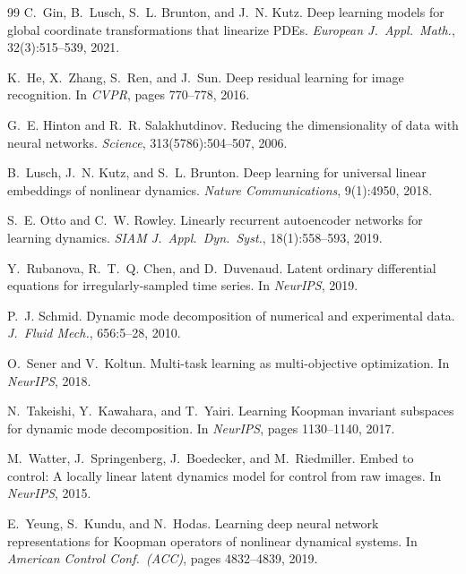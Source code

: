 \documentclass{article}
\begin{document}
\begin{thebibliography}{99}
C.~Gin, B.~Lusch, S.~L. Brunton, and J.~N. Kutz.
\newblock Deep learning models for global coordinate transformations that
  linearize {PDE}s.
\newblock \emph{European J.\ Appl.\ Math.}, 32(3):515--539, 2021.

K.~He, X.~Zhang, S.~Ren, and J.~Sun.
\newblock Deep residual learning for image recognition.
\newblock In \emph{CVPR}, pages 770--778, 2016.

G.~E. Hinton and R.~R. Salakhutdinov.
\newblock Reducing the dimensionality of data with neural networks.
\newblock \emph{Science}, 313(5786):504--507, 2006.

B.~Lusch, J.~N. Kutz, and S.~L. Brunton.
\newblock Deep learning for universal linear embeddings of nonlinear dynamics.
\newblock \emph{Nature Communications}, 9(1):4950, 2018.

S.~E. Otto and C.~W. Rowley.
\newblock Linearly recurrent autoencoder networks for learning dynamics.
\newblock \emph{SIAM J.\ Appl.\ Dyn.\ Syst.}, 18(1):558--593, 2019.

Y.~Rubanova, R.~T.~Q. Chen, and D.~Duvenaud.
\newblock Latent ordinary differential equations for irregularly-sampled time
  series.
\newblock In \emph{NeurIPS}, 2019.

P.~J. Schmid.
\newblock Dynamic mode decomposition of numerical and experimental data.
\newblock \emph{J.\ Fluid Mech.}, 656:5--28, 2010.

O.~Sener and V.~Koltun.
\newblock Multi-task learning as multi-objective optimization.
\newblock In \emph{NeurIPS}, 2018.

N.~Takeishi, Y.~Kawahara, and T.~Yairi.
\newblock Learning {K}oopman invariant subspaces for dynamic mode decomposition.
\newblock In \emph{NeurIPS}, pages 1130--1140, 2017.

M.~Watter, J.~Springenberg, J.~Boedecker, and M.~Riedmiller.
\newblock Embed to control: A locally linear latent dynamics model for control
  from raw images.
\newblock In \emph{NeurIPS}, 2015.

E.~Yeung, S.~Kundu, and N.~Hodas.
\newblock Learning deep neural network representations for {K}oopman operators
  of nonlinear dynamical systems.
\newblock In \emph{American Control Conf.\ (ACC)}, pages 4832--4839, 2019.

\end{thebibliography}
\end{document}
